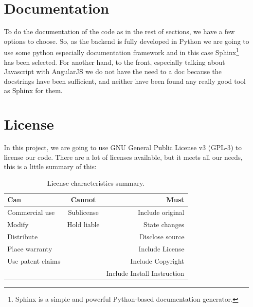 \section{Documentation}

To do the documentation of the code as in the rest of sections, we have a few options
to choose. So, as the backend is fully developed in Python we are going to use some python
especially documentation framework and in this case Sphinx\footnote{Sphinx is a
simple and powerful Python-based documentation generator.} has been selected.
\intro
For another hand, to the front, especially talking about Javascript with AngularJS
we do not have the need to a doc because the docstrings have been sufficient,
and neither have been found any really good tool as Sphinx for them.

\section{License}

In this project, we are going to use GNU General Public License v3 (GPL-3)
to license our code.
There are a lot of licenses available, but it meets all our needs,
this is a little summary of this:

\begin{table}[H]
  \centering
  \begin{tabular}{ l | c | r }
    Can &  Cannot & Must \\
    \hline
    Commercial use    & Sublicense    &  Include original \\
    Modify            & Hold liable   &  State changes \\
    Distribute        &               &  Disclose source \\
    Place warranty    &               &  Include License \\
    Use patent claims &               &  Include Copyright \\
                      &               &  Include Install Instruction \\
  \end{tabular}
  \caption{License characteristics summary.}
\end{table}
